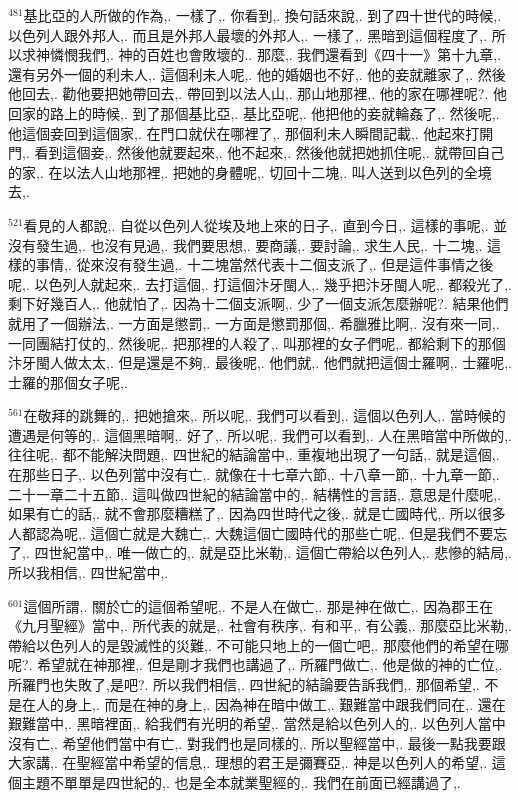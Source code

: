 \documentclass{book}
\begin{document}
$^{481}$基比亞的人所做的作為,.
一樣了,.
你看到,.
換句話來說,.
到了四十世代的時候,.
以色列人跟外邦人,.
而且是外邦人最壞的外邦人,.
一樣了,.
黑暗到這個程度了,.
所以求神憐憫我們,.
神的百姓也會敗壞的..
那麼,.
我們還看到《四十一》第十九章,.
還有另外一個的利未人,.
這個利未人呢,.
他的婚姻也不好,.
他的妾就離家了,.
然後他回去,.
勸他要把她帶回去,.
帶回到以法人山,.
那山地那裡,.
他的家在哪裡呢?.
他回家的路上的時候,.
到了那個基比亞,.
基比亞呢,.
他把他的妾就輪姦了,.
然後呢,.
他這個妾回到這個家,.
在門口就伏在哪裡了,.
那個利未人瞬間記載,.
他起來打開門,.
看到這個妾,.
然後他就要起來,.
他不起來,.
然後他就把她抓住呢,.
就帶回自己的家,.
在以法人山地那裡,.
把她的身體呢,.
切回十二塊,.
叫人送到以色列的全境去,.

$^{521}$看見的人都說,.
自從以色列人從埃及地上來的日子,.
直到今日,.
這樣的事呢,.
並沒有發生過,.
也沒有見過,.
我們要思想,.
要商議,.
要討論,.
求生人民,.
十二塊,.
這樣的事情,.
從來沒有發生過,.
十二塊當然代表十二個支派了,.
但是這件事情之後呢,.
以色列人就起來,.
去打這個,.
打這個汴牙閩人,.
幾乎把汴牙閩人呢,.
都殺光了,.
剩下好幾百人,.
他就怕了,.
因為十二個支派啊,.
少了一個支派怎麼辦呢?.
結果他們就用了一個辦法,.
一方面是懲罰,.
一方面是懲罰那個,.
希臘雅比啊,.
沒有來一同,.
一同團結打仗的,.
然後呢,.
把那裡的人殺了,.
叫那裡的女子們呢,.
都給剩下的那個汴牙閩人做太太,.
但是還是不夠,.
最後呢,.
他們就,.
他們就把這個士羅啊,.
士羅呢,.
士羅的那個女子呢,.

$^{561}$在敬拜的跳舞的,.
把她搶來,.
所以呢,.
我們可以看到,.
這個以色列人,.
當時候的遭遇是何等的,.
這個黑暗啊,.
好了,.
所以呢,.
我們可以看到,.
人在黑暗當中所做的,.
往往呢,.
都不能解決問題,.
四世紀的結論當中,.
重複地出現了一句話,.
就是這個,.
在那些日子,.
以色列當中沒有亡,.
就像在十七章六節,.
十八章一節,.
十九章一節,.
二十一章二十五節,.
這叫做四世紀的結論當中的,.
結構性的言語,.
意思是什麼呢,.
如果有亡的話,.
就不會那麼糟糕了,.
因為四世時代之後,.
就是亡國時代,.
所以很多人都認為呢,.
這個亡就是大魏亡,.
大魏這個亡國時代的那些亡呢,.
但是我們不要忘了,.
四世紀當中,.
唯一做亡的,.
就是亞比米勒,.
這個亡帶給以色列人,.
悲慘的結局,.
所以我相信,.
四世紀當中,.

$^{601}$這個所謂,.
關於亡的這個希望呢,.
不是人在做亡,.
那是神在做亡,.
因為郡王在《九月聖經》當中,.
所代表的就是,.
社會有秩序,.
有和平,.
有公義,.
那麼亞比米勒,.
帶給以色列人的是毀滅性的災難,.
不可能只地上的一個亡吧,.
那麼他們的希望在哪呢?.
希望就在神那裡,.
但是剛才我們也講過了,.
所羅門做亡,.
他是做的神的亡位,.
所羅門也失敗了,是吧?.
所以我們相信,.
四世紀的結論要告訴我們,.
那個希望,.
不是在人的身上,.
而是在神的身上,.
因為神在暗中做工,.
艱難當中跟我們同在,.
還在艱難當中,.
黑暗裡面,.
給我們有光明的希望,.
當然是給以色列人的,.
以色列人當中沒有亡,.
希望他們當中有亡,.
對我們也是同樣的,.
所以聖經當中,.
最後一點我要跟大家講,.
在聖經當中希望的信息,.
理想的君王是彌賽亞,.
神是以色列人的希望,.
這個主題不單單是四世紀的,.
也是全本就業聖經的,.
我們在前面已經講過了,.
\end{document}
